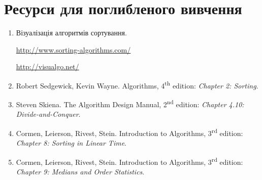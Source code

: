 \documentclass[12pt,a4paper]{report}
\begin{document}
\section*{Ресурси для поглибленого вивчення}
\begin{enumerate}
    \item Візуалізація алгоритмів сортування.

    \href{http://www.sorting-algorithms.com/}{http://www.sorting-algorithms.com/}
    
    \href{http://visualgo.net/}{http://visualgo.net/}

    \item Robert Sedgewick, Kevin Wayne. Algorithms, 4\textsuperscript{th} edition: {\itshape Chapter 2: Sorting}.
    \item Steven Skiena. The Algorithm Design Manual, 2\textsuperscript{nd} edition: {\itshape Chapter 4.10: Divide-and-Conquer}.
    \item Cormen, Leierson, Rivest, Stein. Introduction to Algorithms, 3\textsuperscript{rd} edition: {\itshape Chapter 8: Sorting in Linear Time}.
    \item Cormen, Leierson, Rivest, Stein. Introduction to Algorithms, 3\textsuperscript{rd} edition: {\itshape Chapter 9: Medians and Order Statistics}.
\end{enumerate}
\end{document}
